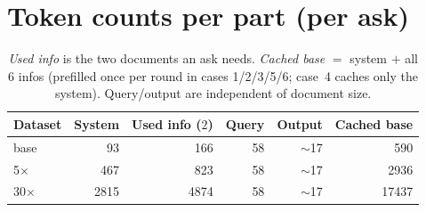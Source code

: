 \documentclass[11pt]{article}
\begin{document}
\section{Token counts per part (per ask)}
\begin{table}[h]
\centering
\renewcommand{\arraystretch}{1.1}
\begin{tabular}{@{}l r r r r r@{}}
\toprule
Dataset & System & Used info ($2$) & Query & Output & Cached base \\
\midrule
base       & 93   & 166  & 58 & $\sim$17 & 590   \\
5$\times$  & 467  & 823  & 58 & $\sim$17 & 2936  \\
30$\times$ & 2815 & 4874 & 58 & $\sim$17 & 17437 \\
\bottomrule
\end{tabular}
\caption{\emph{Used info} is the two documents an ask needs. \emph{Cached base}
$=$ system $+$ all $6$ infos (prefilled once per round in cases 1/2/3/5/6;
case~4 caches only the system). Query/output are independent of document size.}
\end{table}
\end{document}
